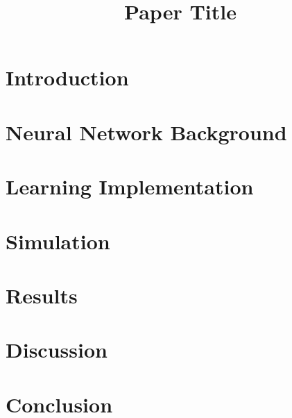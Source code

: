 \documentclass[letterpaper,12pt]{article}
\title{Paper Title}
\begin{document}
\maketitle



\section{Introduction}



\section{Neural Network Background}



\section{Learning Implementation}



\section{Simulation}



\section{Results}



\section{Discussion}



\section{Conclusion}



\nocite{wirefit,qlearn,backprop,practical,tutorial,kinematics}

\pagebreak


\end{document}
